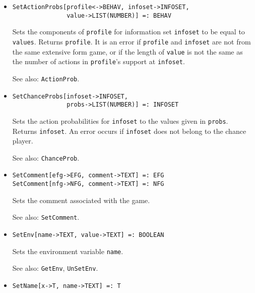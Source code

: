 \begin{itemize}
\item{}
\protect \large \begin{verbatim} 
SetActionProbs[profile<->BEHAV, infoset->INFOSET, 
               value->LIST(NUMBER)] =: BEHAV 
\end{verbatim}\normalsize

\bd
Sets the components of \verb+profile+ for
information set \verb+infoset+ to be equal to \verb+values+.
Returns \verb+profile+.  It is an error if \verb+profile+ and \verb+infoset+
are not from the same extensive form game, or if the length of
\verb+value+ is not the same as the number of actions in \verb+profile+'s
support at \verb+infoset+.
\item [See also:] \verb+ActionProb+.
\ed

\item{}
\protect \large \begin{verbatim} 
SetChanceProbs[infoset->INFOSET, 
               probs->LIST(NUMBER)] =: INFOSET 
\end{verbatim}\normalsize

\bd
Sets the action probabilities for 
\verb+infoset+ to the values given in \verb+probs+.  Returns \verb+infoset+. 
An error occurs if \verb+infoset+ does not belong to the chance player.
\item [See also:] \verb+ChanceProb+.
\ed

\item{}
\protect \large \begin{verbatim}
SetComment[efg->EFG, comment->TEXT] =: EFG
SetComment[nfg->NFG, comment->TEXT] =: NFG
\end{verbatim} \normalsize

\bd
Sets the comment associated with the game.
\item [See also:] \verb+SetComment+.
\ed

\item{}
\protect \large \begin{verbatim}
SetEnv[name->TEXT, value->TEXT] =: BOOLEAN 
\end{verbatim} \normalsize

\bd
Sets the environment variable \verb+name+.
\item [See also:] \verb+GetEnv+, \verb+UnSetEnv+.
\ed

\item{}
\protect \large \begin{verbatim}
SetName[x->T, name->TEXT] =: T
\end{verbatim}\normalsize


\end{itemize}
